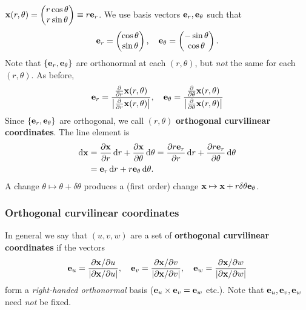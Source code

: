 \begin{example}
    $ \mathbf{x}(r,\theta)=\begin{pmatrix}
        r\cos \theta \\ r\sin\theta
    \end{pmatrix}\equiv r{\bf e}_r $. We use basis vectors $ {\bf e}_r,{\bf e}_\theta $ such that 
    \[
        {\bf e}_r=\begin{pmatrix}
            \cos\theta \\ \sin\theta
        \end{pmatrix},\quad {\bf e}_\theta = \begin{pmatrix}
            -\sin \theta  \\\cos \theta 
        \end{pmatrix}.
    \]
    Note that $ \{{\bf e}_r,{\bf e}_\theta\} $ are orthonormal at each $ (r,\theta) $, but \textit{not} the same for each $ (r,\theta) $. As before,
    \[
        {\bf e}_r = \frac{\frac{\partial }{\partial r}{\bf x}(r,\theta) }{\left| \frac{\partial }{\partial r}{\bf x}(r,\theta) \right| },\quad {\bf e}_\theta=\frac{\frac{\partial }{\partial \theta}{\bf x}(r,\theta) }{\left| \frac{\partial }{\partial \theta}{\bf x}(r,\theta) \right| }
    \]
    Since $ \{{\bf e}_r,{\bf e}_\theta\} $ are orthogonal, we call $ (r,\theta) $ \textbf{orthogonal curvilinear coordinates}. The line element is 
    \begin{align*}
        \mathrm{d} {\bf x}&= \frac{\partial {\bf x}}{\partial r}\,\mathrm{d} r+\frac{\partial {\bf x}}{\partial \theta}\,\mathrm{d} \theta = \frac{\partial r{\bf e}_r}{\partial r}\,\mathrm{d} r+\frac{\partial r{\bf e}_r}{\partial \theta}\,\mathrm{d} \theta\\ 
        &= {\bf e}_r \,\mathrm{d} r+ r{\bf e}_\theta\,\mathrm{d} \theta.
    \end{align*}
    A change $ \theta \mapsto \theta+ \delta \theta $ produces a (first order) change $ \mathbf{x}\mapsto \mathbf{x}+r\delta \theta{\bf e}_\theta  $.
\end{example}

\subsubsection*{Orthogonal curvilinear coordinates}
In general we say that $(u, v, w)$ are a set of \textbf{orthogonal curvilinear coordinates} if the vectors
\[
    {\bf e}_u = \frac{\partial {\bf x}/\partial u }{\left| \partial {\bf x}/\partial u \right| },\quad {\bf e}_v=\frac{\partial {\bf x}/\partial v }{\left| \partial {\bf x}/\partial v \right| },\quad {\bf e}_w=\frac{\partial {\bf x}/\partial w }{\left| \partial {\bf x}/\partial w \right| }
\]
form a \textit{right-handed orthonormal} basis ($ {\bf e}_u\times{\bf e}_v={\bf e}_w $ etc.). Note that $ {\bf e}_u,{\bf e}_v,{\bf e}_w $ need \textit{not} be fixed.

